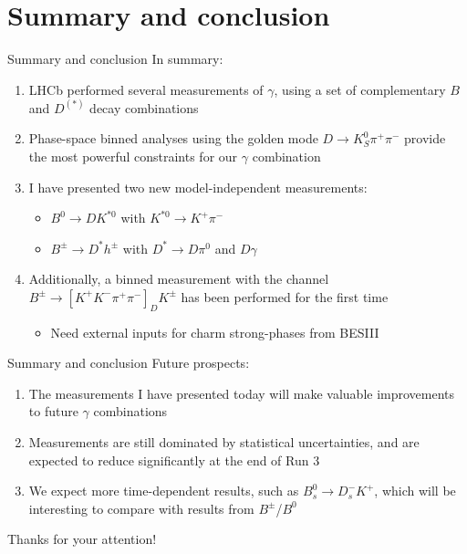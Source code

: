 \documentclass[xcolor={dvipsnames}]{beamer}
\begin{document}
\section{Summary and conclusion}
\begin{frame}{Summary and conclusion}
  \vspace{0.0cm}
  {\Large In summary:}
  \vspace{0.3cm}
  \begin{enumerate}
    \setlength\itemsep{1.0em}
    \item{LHCb performed several measurements of $\gamma$, using a set of complementary $B$ and $D^{(*)}$ decay combinations}
    \item{Phase-space binned analyses using the golden mode $D\to K_S^0\pi^+\pi^-$ provide the most powerful constraints for our $\gamma$ combination}
    \item{I have presented two new model-independent measurements:}
    \begin{itemize}
      \item{$B^0\to DK^{*0}$ with $K^{*0}\to K^+\pi^-$}
      \item{$B^\pm\to D^{*}h^\pm$ with $D^*\to D\pi^0$ and $D\gamma$}
    \end{itemize}
    \item{Additionally, a binned measurement with the channel $B^\pm\to[K^+K^-\pi^+\pi^-]_DK^\pm$ has been performed for the first time}
    \begin{itemize}
      \item{Need external inputs for charm strong-phases from BESIII}
    \end{itemize}
  \end{enumerate}
\end{frame}

\begin{frame}{Summary and conclusion}
  \vspace{0.0cm}
  {\Large Future prospects:}
  \vspace{0.3cm}
  \begin{enumerate}
    \setlength\itemsep{1.0em}
    \item{The measurements I have presented today will make valuable improvements to future $\gamma$ combinations}
    \item{Measurements are still dominated by statistical uncertainties, and are expected to reduce significantly at the end of Run 3}
    \item{We expect more time-dependent results, such as $B_s^0\to D_s^-K^+$, which will be interesting to compare with results from $B^\pm$/$B^0$}
    \end{enumerate}
    \vspace{1.0cm}
  \begin{center}
    {\huge Thanks for your attention!}
  \end{center}
\end{frame}
\end{document}
